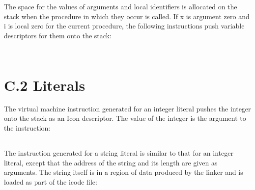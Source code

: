 The space for the values of arguments and local identifiers is
allocated on the stack when the procedure in which they occur is
called. If x is argument zero and i is local zero for the current
procedure, the following instructions push variable descriptors for
them onto the stack:

\begin{flushleft}
\tablelasttail{\hline}
\begin{xtabular}{|m{1.9066598in}|m{2.75596in}|}

\end{xtabular}
\end{flushleft}

\bigskip

\begin{flushleft}
\tablelasttail{\hline}
\begin{xtabular}{|m{1.9066598in}|m{2.75596in}|}

\end{xtabular}
\end{flushleft}


\section{C.2 Literals}

The virtual machine instruction generated for an integer literal
pushes the integer onto the stack as an Icon descriptor. The value of
the integer is the argument to the instruction:

\begin{flushleft}
\tablelasttail{\hline}
\begin{xtabular}{|m{1.9066598in}|m{2.75596in}|}

\end{xtabular}
\end{flushleft}

The instruction generated for a string literal is similar to that for
an integer literal, except that the address of the string and its
length are given as arguments. The string itself is in a region of
data produced by the linker and is loaded as part of the icode file:

